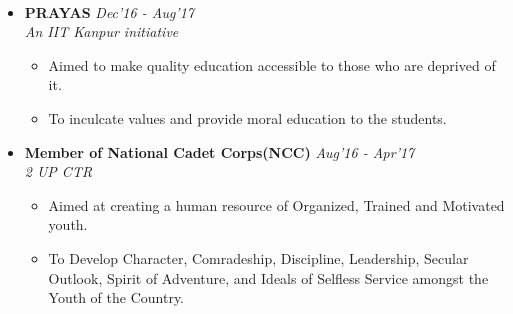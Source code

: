 \\[\lsep]
\begin{itemize}
\item \textbf{PRAYAS} \hfill \textit{Dec'16 - Aug'17} \\
 \emph{An IIT Kanpur initiative} \\ \vspace{-0.1cm}
    \begin{itemize}\itemsep \isep
        \item Aimed to make quality education accessible to those who are deprived of it.
        \item To inculcate values and provide moral education to the students.
    \end{itemize}
\item \textbf{Member of National Cadet Corps(NCC)} \hfill \textit{Aug'16 - Apr'17} \\
 \emph{2 UP CTR}\\ \vspace{-0.1cm}
    \begin{itemize}
        \item Aimed at creating a human resource of Organized, Trained and Motivated youth.
        \item To Develop Character, Comradeship, Discipline, Leadership, Secular Outlook, Spirit of Adventure, and Ideals of Selfless Service amongst the Youth of the Country.
    \end{itemize}
\end{itemize}



